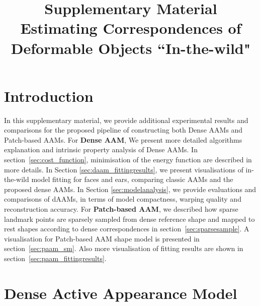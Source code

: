 






\title{Supplementary Material \\ Estimating Correspondences of Deformable Objects ``In-the-wild"}

\maketitle
\thispagestyle{empty}


\section*{Introduction}
In this supplementary material, we provide additional experimental results and comparisons for the proposed pipeline of constructing both Dense AAMs and Patch-based AAMs. 
For \textbf{Dense AAM}, We present more detailed algorithms explanation and intrinsic property analysis of Dense AAMs. In section~\ref{sec:cost_function},  minimisation of the energy function are described in more details. In Section \ref{sec:daam_fittingresults}, we present visualisations of in-the-wild model fitting  for faces and ears, comparing classic AAMs and the proposed dense AAMs. In Section \ref{sec:modelanalysis}, we provide evaluations and comparisons of dAAMs, in terms of model compactness, warping quality and reconstruction accuracy. 
For \textbf{Patch-based AAM}, we described how sparse landmark points are sparsely sampled from dense reference shape and mapped to rest shapes according to dense correspondences in section~\ref{sec:sparsesample}. A visualisation for Patch-based AAM shape model is presented in section~\ref{sec:paam_sm}. Also more visualisation of fitting results are shown in section~\ref{sec:paam_fittingresults}.















\appendix
\section{Dense Active Appearance Model}
\label{sec:daam}

